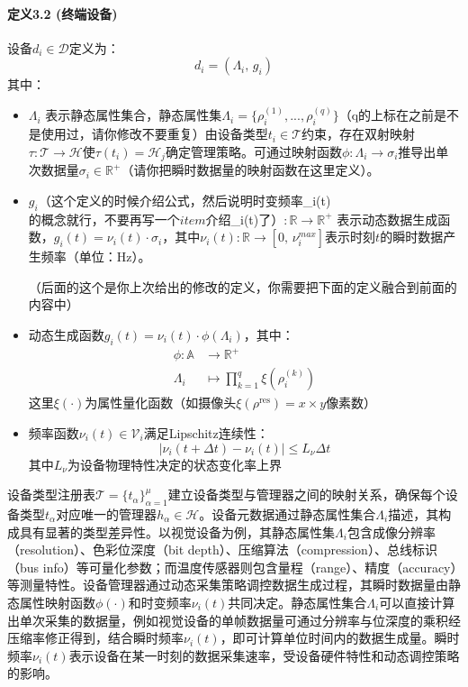 \paragraph{定义3.2 (终端设备)} 设备$d_i \in \mathcal{D}$定义为：
\[
d_i = (\Lambda_i,\, g_i)
\]
其中：
\begin{itemize}
    \item $\Lambda_i$ 表示静态属性集合，静态属性集$\Lambda_i = \{\rho^{(1)}_i, ..., \rho^{(q)}_i\}$（q的上标在之前是不是使用过，请你修改不要重复）由设备类型$t_i \in \mathcal{T}$约束，存在双射映射$\tau: \mathcal{T} \to \mathcal{H}$使$\tau(t_i) = \mathcal{H}_j$确定管理策略。可通过映射函数$\phi: \Lambda_i \to \sigma_i$推导出单次数据量$\sigma_i \in \mathbb{R}^+$（请你把瞬时数据量的映射函数在这里定义）。
    
    \item $g_i（这个定义的时候介绍公式，然后说明时变频率$\nu_i(t)$的概念就行，不要再写一个item介绍$\nu_i(t)$了）: \mathbb{R} \to \mathbb{R}^+$ 表示动态数据生成函数，$g_i(t) = \nu_i(t) \cdot \sigma_i$，其中$\nu_i(t): \mathbb{R} \to [0,\, \nu_i^{max}]$表示时刻$t$的瞬时数据产生频率（单位：Hz）。

（后面的这个是你上次给出的修改的定义，你需要把下面的定义融合到前面的内容中）
    \item 动态生成函数$g_i(t) = \nu_i(t) \cdot \phi(\Lambda_i)$，其中：
    \begin{align*}
        \phi: \mathbb{A} & \to \mathbb{R}^+ \\
        \Lambda_i & \mapsto \prod_{k=1}^q \xi(\rho^{(k)}_i) 
    \end{align*}
    这里$\xi(\cdot)$为属性量化函数（如摄像头$\xi(\rho^{\text{res}})=x \times y$像素数）
    
    \item 频率函数$\nu_i(t) \in \mathcal{V}_i$满足Lipschitz连续性：
    \begin{equation}
        |\nu_i(t+\Delta t) - \nu_i(t)| \leq L_\nu \Delta t
    \end{equation}
    其中$L_\nu$为设备物理特性决定的状态变化率上界
\end{itemize}


设备类型注册表$\mathcal{T} = \{t_\alpha\}_{\alpha=1}^\mu$建立设备类型与管理器之间的映射关系，确保每个设备类型$t_\alpha$对应唯一的管理器$h_\alpha \in \mathcal{H}$。设备元数据通过静态属性集合$\Lambda_i$描述，其构成具有显著的类型差异性。以视觉设备为例，其静态属性集$\Lambda_i$包含成像分辨率（resolution）、色彩位深度（bit depth）、压缩算法（compression）、总线标识（bus info）等可量化参数；而温度传感器则包含量程（range）、精度（accuracy）等测量特性。设备管理器通过动态采集策略调控数据生成过程，其瞬时数据量由静态属性映射函数$\phi(\cdot)$和时变频率$\nu_i(t)$共同决定。静态属性集合$\Lambda_i$可以直接计算出单次采集的数据量，例如视觉设备的单帧数据量可通过分辨率与位深度的乘积经压缩率修正得到，结合瞬时频率$\nu_i(t)$，即可计算单位时间内的数据生成量。瞬时频率$\nu_i(t)$表示设备在某一时刻的数据采集速率，受设备硬件特性和动态调控策略的影响。

